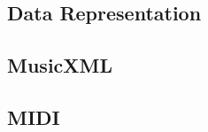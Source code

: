 \begin{appendices}
\section{Data Representation} \label{ase:app_one_sect_2}
    
\subsection{MusicXML}
\subsection{MIDI}
\end{appendices}